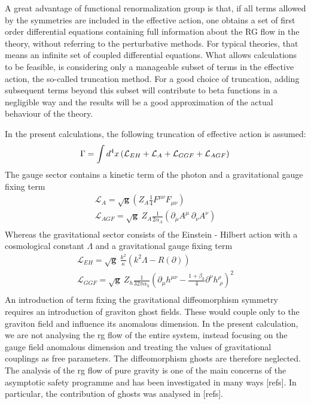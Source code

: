 \documentclass[11pt, a4paper]{article}
\begin{document}
A great advantage of functional renormalization group is that, if all terms
allowed by the symmetries are included in the effective action, one obtains a set of first order
differential equations containing full information about the RG flow in the theory, without referring to the perturbative methods.
For typical theories, that means an infinite set of coupled differential equations.
What allows calculations to be feasible, is considering only a manageable subset of terms in the effective action, the so-called truncation method.
For a good choice of truncation, adding subsequent terms beyond this subset will contribute to beta functions in a negligible way
and the results will be a good approximation of the actual behaviour of the theory.

In the present calculations, the following truncation of effective action is assumed:
\begin{equation}
    \Gamma = \int d^4 x \left( \mathcal{L}_{EH} + \mathcal{L}_A + \mathcal{L}_{GGF} + \mathcal{L}_{AGF} \right) \\
\end{equation}
The gauge sector contains a kinetic term of the photon
and a gravitational gauge fixing term
\begin{gather}
    \mathcal{L}_A =  \sqrt{\mathbf{g}} \left( Z_A \frac{1}{4} F^{\mu\nu} F_{\mu\nu} \right)\\%
    \mathcal{L}_{AGF} = \sqrt{\mathbf{g}} \ Z_A \frac{1}{2 \alpha_A} \left( \partial_\mu A^\mu \ \partial_\nu A^\nu \right) \\
\end{gather}
Whereas the gravitational sector consists of the Einstein - Hilbert action with a cosmological constant $\Lambda$ and a gravitational gauge fixing term
\begin{gather}
    \mathcal{L}_{EH} = \sqrt{\mathbf{g}} \ \frac{k^2}{\kappa} \left( k^2 \Lambda - R(\partial)\right) \\
    \mathcal{L}_{GGF} = \sqrt{\mathbf{g}} \ Z_h \frac{1}{32 \pi \alpha_h} \left(\partial_\mu h^{\mu\nu} - \frac{1+\beta_h}{4} \partial^\nu h^\rho_{\; \rho} \right)^2\\
\end{gather}
An introduction of term fixing the gravitational diffeomorphism symmetry requires an introduction of graviton ghost fields.
These would couple only to the graviton field and influence its anomalous dimension. In the present calculation, we are not
analysing the rg flow of the entire system, instead focusing on the gauge field anomalous dimension and treating the values of
gravitational couplings as free parameters. The diffeomorphism ghosts are therefore neglected. The 
analysis of the rg flow of pure gravity is one of the main concerns of the asymptotic safety programme and has been
investigated in many ways [refs]. In particular, the contribution of ghosts was analysed in [refs]. %
\end{document}
